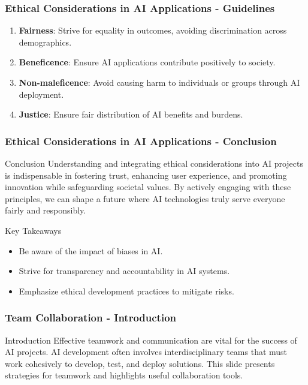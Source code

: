 \documentclass{beamer}
\begin{document}
\begin{frame}[fragile]
    \frametitle{Ethical Considerations in AI Applications - Guidelines}
    \begin{enumerate}
        \item \textbf{Fairness}: Strive for equality in outcomes, avoiding discrimination across demographics.
        \item \textbf{Beneficence}: Ensure AI applications contribute positively to society.
        \item \textbf{Non-maleficence}: Avoid causing harm to individuals or groups through AI deployment.
        \item \textbf{Justice}: Ensure fair distribution of AI benefits and burdens.
    \end{enumerate}
\end{frame}

\begin{frame}[fragile]
    \frametitle{Ethical Considerations in AI Applications - Conclusion}
    \begin{block}{Conclusion}
        Understanding and integrating ethical considerations into AI projects is indispensable in fostering trust, enhancing user experience, and promoting innovation while safeguarding societal values. By actively engaging with these principles, we can shape a future where AI technologies truly serve everyone fairly and responsibly.
    \end{block}
    
    \begin{block}{Key Takeaways}
        \begin{itemize}
            \item Be aware of the impact of biases in AI.
            \item Strive for transparency and accountability in AI systems.
            \item Emphasize ethical development practices to mitigate risks.
        \end{itemize}
    \end{block}
\end{frame}

\begin{frame}[fragile]
    \frametitle{Team Collaboration - Introduction}
    \begin{block}{Introduction}
        Effective teamwork and communication are vital for the success of AI projects. 
        AI development often involves interdisciplinary teams that must work cohesively to develop, test, and deploy solutions. 
        This slide presents strategies for teamwork and highlights useful collaboration tools.
    \end{block}
\end{frame}
\end{document}
